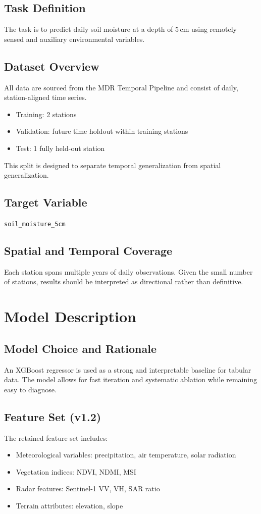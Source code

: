 \documentclass[11pt]{article}
\begin{document}
\subsection{Task Definition}
The task is to predict daily soil moisture at a depth of 5\,cm using remotely sensed and auxiliary environmental variables.

\subsection{Dataset Overview}
All data are sourced from the MDR Temporal Pipeline and consist of daily, station-aligned time series.

\begin{itemize}
\item Training: 2 stations
\item Validation: future time holdout within training stations
\item Test: 1 fully held-out station
\end{itemize}

This split is designed to separate temporal generalization from spatial generalization.

\subsection{Target Variable}
\texttt{soil\_moisture\_5cm}

\subsection{Spatial and Temporal Coverage}
Each station spans multiple years of daily observations. Given the small number of stations, results should be interpreted as directional rather than definitive.

\section{Model Description}

\subsection{Model Choice and Rationale}
An XGBoost regressor is used as a strong and interpretable baseline for tabular data. The model allows for fast iteration and systematic ablation while remaining easy to diagnose.

\subsection{Feature Set (v1.2)}
The retained feature set includes:
\begin{itemize}
\item Meteorological variables: precipitation, air temperature, solar radiation
\item Vegetation indices: NDVI, NDMI, MSI
\item Radar features: Sentinel-1 VV, VH, SAR ratio
\item Terrain attributes: elevation, slope
\end{itemize}
\end{document}

